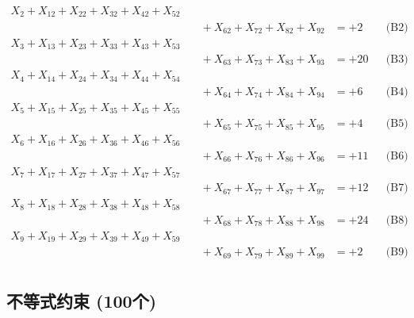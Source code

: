 \documentclass[a4paper,10pt]{article}
\begin{document}
{\begin{align}
X_{2} + X_{12} + X_{22} + X_{32} + X_{42} + X_{52} \\[0.1ex]
&\quad  + X_{62} + X_{72} + X_{82} + X_{92} &= +2 && \text{(B2)} \\
X_{3} + X_{13} + X_{23} + X_{33} + X_{43} + X_{53} \\[0.1ex]
&\quad  + X_{63} + X_{73} + X_{83} + X_{93} &= +20 && \text{(B3)} \\
X_{4} + X_{14} + X_{24} + X_{34} + X_{44} + X_{54} \\[0.1ex]
&\quad  + X_{64} + X_{74} + X_{84} + X_{94} &= +6 && \text{(B4)} \\
\allowbreak
X_{5} + X_{15} + X_{25} + X_{35} + X_{45} + X_{55} \\[0.1ex]
&\quad  + X_{65} + X_{75} + X_{85} + X_{95} &= +4 && \text{(B5)} \\
X_{6} + X_{16} + X_{26} + X_{36} + X_{46} + X_{56} \\[0.1ex]
&\quad  + X_{66} + X_{76} + X_{86} + X_{96} &= +11 && \text{(B6)} \\
X_{7} + X_{17} + X_{27} + X_{37} + X_{47} + X_{57} \\[0.1ex]
&\quad  + X_{67} + X_{77} + X_{87} + X_{97} &= +12 && \text{(B7)} \\
X_{8} + X_{18} + X_{28} + X_{38} + X_{48} + X_{58} \\[0.1ex]
&\quad  + X_{68} + X_{78} + X_{88} + X_{98} &= +24 && \text{(B8)} \\
X_{9} + X_{19} + X_{29} + X_{39} + X_{49} + X_{59} \\[0.1ex]
&\quad  + X_{69} + X_{79} + X_{89} + X_{99} &= +2 && \text{(B9)} \\
\end{align}
}

\subsection{不等式约束 (100个)}
\end{document}
